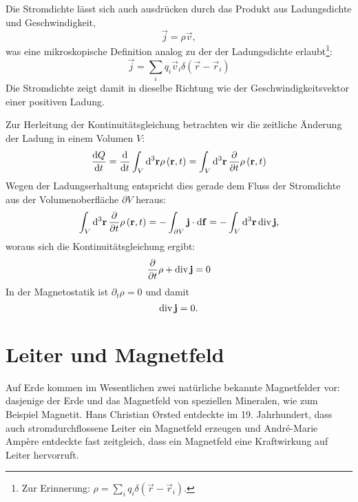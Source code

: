 Die Stromdichte lässt sich auch ausdrücken durch das Produkt aus Ladungsdichte und Geschwindigkeit,
\begin{equation*}
	\vec {j}=\rho \vec {v},
\end{equation*}
was eine mikroskopische Definition analog zu der der Ladungsdichte erlaubt\footnote{Zur Erinnerung: $\rho =\sum _{i}q_{i}\delta \left(\vec {r}-\vec {r}_{i}\right)$.}:
\begin{equation*}
	\vec {j}=\sum _{i}q_{i}\vec {v}_{i}\delta \left(\vec {r}-\vec {r}_{i}\right)
\end{equation*}
Die Stromdichte zeigt damit in dieselbe Richtung wie der Geschwindigkeitsvektor einer positiven Ladung.

Zur Herleitung der Kontinuitätsgleichung betrachten wir die zeitliche Änderung der Ladung in einem Volumen $V$:
\begin{equation*}
	\frac{\diff Q}{\diff t}=\frac{\diff }{\diff t}\int _{V}\diff^{3}\vec {r}\rho \left(\vec {r},t\right)=\int _{V}\diffa[3]{\vec{r}}\frac{\partial }{\partial t}\rho \left(\vec {r},t\right)
\end{equation*}
Wegen der Ladungserhaltung entspricht dies gerade dem Fluss der Stromdichte aus der Volumenoberfläche $\partial V$ heraus:
\begin{equation*}
	\int _{V}\diffa[3]{\vec{r}}\frac{\partial }{\partial t}\rho \left(\vec {r},t\right)=-\int _{\partial V}\vec {j}\cdot \diff \vec {f}=-\int _{V}\diffa[3]{\vec{r}}\divg \vec {j},
\end{equation*}
woraus sich die Kontinuitätsgleichung ergibt:
\begin{equation*}
	\frac{\partial }{\partial t}\rho +\divg \vec {j}=0
\end{equation*}
In der Magnetostatik ist $\partial _{t}\rho =0$ und damit
\begin{equation*}
	\divg \vec {j}=0.
\end{equation*}
\section{Leiter und Magnetfeld}

Auf Erde kommen im Wesentlichen zwei natürliche bekannte Magnetfelder vor: dasjenige der Erde und das Magnetfeld von speziellen Mineralen, wie zum Beispiel Magnetit. Hans Christian \O{}rsted entdeckte im 19. Jahrhundert, dass auch stromdurchflossene Leiter ein Magnetfeld erzeugen und André-Marie Ampère entdeckte fast zeitgleich, dass ein Magnetfeld eine Kraftwirkung auf Leiter hervorruft.

